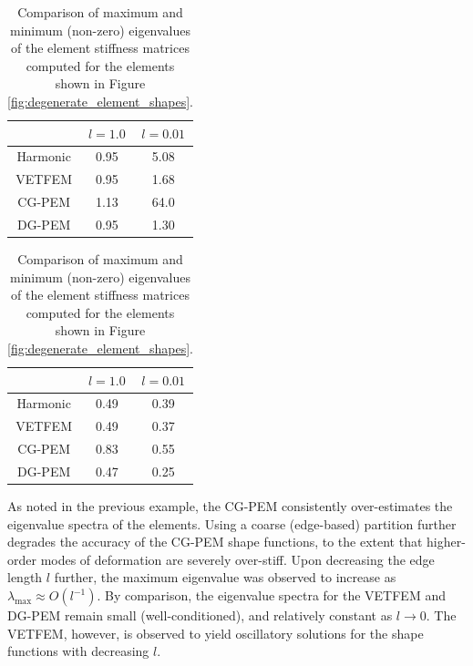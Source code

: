 \begin{table}
\centering
\begin{subtable}{.5\textwidth}
\centering
\begin{tabular}{| c || c | c |}
    \hline
             & $l=1.0$ & $l=0.01$ \\ \hline \hline
    Harmonic & 0.95 & 5.08 \\ \hline
    VETFEM   & 0.95 & 1.68 \\ \hline
    CG-PEM   & 1.13 & 64.0 \\ \hline
    DG-PEM   & 0.95 & 1.30 \\
    \hline
    \end{tabular}
    \caption{Largest eigenvalue: $\lambda_{\max}$}
    \label{tab:degenerate_stiffness_max_eigenvalue}
\end{subtable}%
\begin{subtable}{.5\textwidth}
\centering
\begin{tabular}{| c || c | c |}
    \hline
             & $l=1.0$ & $l=0.01$ \\ \hline \hline
    Harmonic & 0.49 & 0.39 \\ \hline
    VETFEM   & 0.49 & 0.37 \\ \hline
    CG-PEM   & 0.83 & 0.55 \\ \hline
    DG-PEM   & 0.47 & 0.25 \\
    \hline
    \end{tabular}
    \caption{Smallest (non-zero) eigenvalue: $\lambda_{\min}$}
    \label{tab:degenerate_stiffness_min_eigenvalue}
\end{subtable}

\caption{Comparison of maximum and minimum (non-zero) eigenvalues of the element stiffness matrices computed for the elements shown in Figure \ref{fig:degenerate_element_shapes}.}
\label{tab:degenerate_stiffness_max_min_eigenvalue}
\end{table}

As noted in the previous example, the CG-PEM consistently over-estimates the eigenvalue spectra of the elements. Using a coarse (edge-based) partition further degrades the accuracy of the CG-PEM shape functions, to the extent that higher-order modes of deformation are severely over-stiff. Upon decreasing the edge length $l$ further, the maximum eigenvalue was observed to increase as $\lambda_{\max} \approx O (l^{-1})$. By comparison, the eigenvalue spectra for the VETFEM and DG-PEM remain small (well-conditioned), and relatively constant as $l \rightarrow 0$. The VETFEM, however, is observed to yield oscillatory solutions for the shape functions with decreasing $l$.

